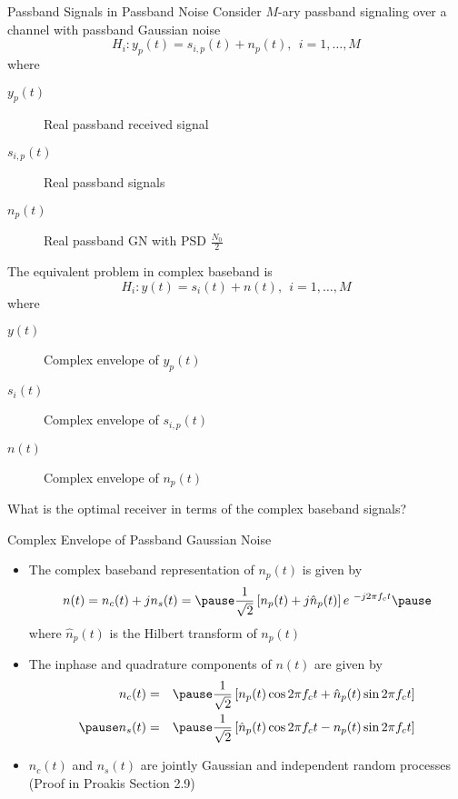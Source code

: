 \documentclass[t]{beamer}
\begin{document}
\begin{frame}{Passband Signals in Passband Noise}
  \footnotesize
  Consider $M$-ary passband signaling over a channel with passband Gaussian noise
    \begin{equation*}
      H_i  :  y_p(t) = s_{i,p}(t) + n_p(t), \ \ i=1,\ldots,M
    \end{equation*}
    where 
      \begin{description}
        \item[$y_p(t)$] Real passband received signal
        \item[$s_{i,p}(t)$] Real passband signals
        \item[$n_p(t)$] Real passband GN with PSD $\frac{N_0}{2}$
      \end{description}
  The equivalent problem in complex baseband is
    \begin{equation*}
      H_i  :  y(t) = s_i(t) + n(t), \ \ i=1,\ldots,M
    \end{equation*}
    \pause where
      \begin{description}
        \item[$y(t)$] Complex envelope of $y_p(t)$
        \pause
        \item[$s_i(t)$] Complex envelope of $s_{i,p}(t)$
        \pause
        \item[$n(t)$] Complex envelope of $n_p(t)$
      \end{description}
    \pause \alert{What is the optimal receiver in terms of the complex baseband signals?}
  \normalsize
\end{frame}

\begin{frame}{Complex Envelope of Passband Gaussian Noise}
  \footnotesize
  \begin{itemize}
    \item \pause The complex baseband representation of $n_p(t)$ is given by
      \begin{equation*}
        n(t) =  n_c(t) + j n_s(t) = \pause \frac{1}{\sqrt{2}}\left[ n_p(t) + j\hat{n}_p(t)\right]e^{\ -j2\pi f_c t} \pause
      \end{equation*}
    where $\hat{n}_p(t)$ is the Hilbert transform of $n_p(t)$
    \item \pause The inphase and quadrature components of $n(t)$ are given by
      \begin{eqnarray*}
        n_c(t) & = & \pause \frac{1}{\sqrt{2}} \left[ n_p(t) \cos 2\pi f_c t + \hat{n}_p(t) \sin 2\pi f_c t\right] \\ \pause
        n_s(t) & = & \pause \frac{1}{\sqrt{2}} \left[ \hat{n}_p(t) \cos 2\pi f_c t - n_p(t) \sin 2\pi f_c t\right] 
      \end{eqnarray*}
    \item \pause $n_c(t)$ and $n_s(t)$ are jointly Gaussian and independent random processes \pause (Proof in Proakis Section 2.9)
  \end{itemize}
  \normalsize
\end{frame}
\end{document}
